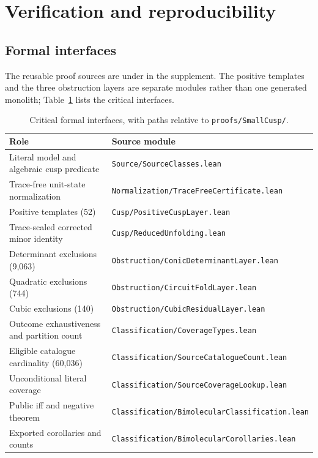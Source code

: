 \documentclass[11pt,a4paper]{article}
\theoremstyle{plain}
\theoremstyle{definition}
\theoremstyle{remark}
\numberwithin{equation}{section}
\begin{document}
\section{Verification and reproducibility}\label{sec:verification}

\subsection{Formal interfaces}
The reusable proof sources are under  in the supplement. The positive templates and the three obstruction layers are separate modules rather than one generated monolith; Table~\ref{tab:formal} lists the critical interfaces.

\begin{table}[tb]
\centering\small
\caption{Critical formal interfaces, with paths relative to \texttt{proofs/SmallCusp/}.}
\label{tab:formal}
\begin{tabular}{p{.40\linewidth}p{.54\linewidth}}\toprule
Role & Source module\\\midrule
Literal model and algebraic cusp predicate & \texttt{Source/SourceClasses.lean}\\
Trace-free unit-state normalization & \texttt{Normalization/TraceFreeCertificate.lean}\\
Positive templates (52) & \texttt{Cusp/PositiveCuspLayer.lean}\\
Trace-scaled corrected minor identity & \texttt{Cusp/ReducedUnfolding.lean}\\
Determinant exclusions (9,063) & \texttt{Obstruction/ConicDeterminantLayer.lean}\\
Quadratic exclusions (744) & \texttt{Obstruction/CircuitFoldLayer.lean}\\
Cubic exclusions (140) & \texttt{Obstruction/CubicResidualLayer.lean}\\
Outcome exhaustiveness and partition count & \texttt{Classification/CoverageTypes.lean}\\
Eligible catalogue cardinality (60,036) & \texttt{Classification/SourceCatalogueCount.lean}\\
Unconditional literal coverage & \texttt{Classification/SourceCoverageLookup.lean}\\
Public iff and negative theorem & \texttt{Classification/BimolecularClassification.lean}\\
Exported corollaries and counts & \texttt{Classification/BimolecularCorollaries.lean}\\\bottomrule
\end{tabular}
\end{table}
\end{document}
